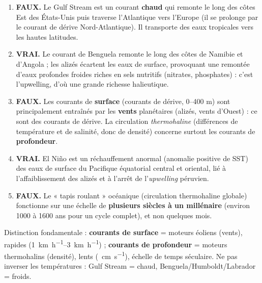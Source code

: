 \documentclass[11pt]{article}
\newcommand{\cle}[1]{{\popxbold\color{popdark}#1}}
\begin{document}
\begin{corrige}
\begin{enumerate}
    \item \textbf{FAUX.} Le \cle{Gulf Stream} est un courant \textbf{chaud} qui remonte le long des côtes Est des États-Unis puis traverse l'Atlantique vers l'Europe (il se prolonge par le \cle{courant de dérive Nord-Atlantique}). Il transporte des eaux tropicales vers les hautes latitudes.
    \item \textbf{VRAI.} Le \cle{courant de Benguela} remonte le long des côtes de Namibie et d'Angola ; les alizés écartent les eaux de surface, provoquant une remontée d'eaux profondes froides riches en sels nutritifs (nitrates, phosphates) : c'est l'\cle{upwelling}, d'où une grande richesse halieutique.
    \item \textbf{FAUX.} Les courants de \textbf{surface} (courants de dérive, 0--400 m) sont principalement entraînés par les \textbf{vents} planétaires (alizés, vents d'Ouest) : ce sont des courants de dérive. La circulation \emph{thermohaline} (différences de température et de salinité, donc de densité) concerne surtout les courants de \textbf{profondeur}.
    \item \textbf{VRAI.} \cle{El Niño} est un réchauffement anormal (anomalie positive de SST) des eaux de surface du Pacifique équatorial central et oriental, lié à l'affaiblissement des alizés et à l'arrêt de l'\emph{upwelling} péruvien.
    \item \textbf{FAUX.} Le « tapis roulant » océanique (circulation thermohaline globale) fonctionne sur une échelle de \textbf{plusieurs siècles à un millénaire} (environ 1000 à 1600 ans pour un cycle complet), et non quelques mois.
\end{enumerate}
\end{corrige}

\begin{attention}
Distinction fondamentale : \textbf{courants de surface} = moteurs éoliens (vents), rapides (\SIrange{1}{3}{\kilo\meter\per\hour}) ; \textbf{courants de profondeur} = moteurs thermohalins (densité), lents (\SI{}{\centi\meter\per\second}), échelle de temps séculaire. Ne pas inverser les températures : Gulf Stream = chaud, Benguela/Humboldt/Labrador = froids.
\end{attention}
\end{document}
